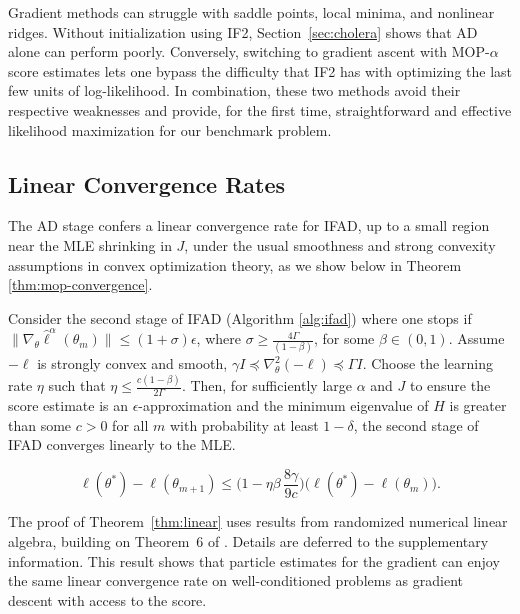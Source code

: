 \documentclass[9pt,twocolumn,pnasresearcharticle]{pnas-new}
\newcommand\arxiv[2]{#2} %
\begin{document}
Gradient methods can struggle with saddle points, local minima, and nonlinear ridges.
Without initialization using IF2, Section~\ref{sec:cholera} shows that AD alone can perform poorly.
Conversely, switching to gradient ascent with MOP-$\alpha$ score estimates lets one bypass the difficulty that IF2 has with optimizing the last few units of log-likelihood. 
In combination, these two methods avoid their respective weaknesses and provide, for the first time, straightforward and effective likelihood maximization for our benchmark problem.

\arxiv{}{\vspace*{-2mm}}
\subsection{Linear Convergence Rates}

The AD stage confers a linear convergence rate for IFAD, up to a small region near the MLE shrinking in $J$, under the usual smoothness and strong convexity assumptions in convex optimization theory, as we show below in Theorem \ref{thm:mop-convergence}.

\begin{thm} \label{thm:linear}
    
Consider the second stage of IFAD (Algorithm \ref{alg:ifad}) where one stops if $\|\nabla_\theta \hat\ell^\alpha(\theta_m)\| \leq (1+\sigma) \epsilon$, where $\sigma \geq \frac{4 \Gamma}{(1-\beta)}$, for some $\beta \in (0,1)$. Assume $-\ell$ is strongly convex and smooth, $\gamma I \preceq \nabla_\theta^2 (-\ell) \preceq \Gamma I$. Choose the learning rate $\eta$ such that $\eta \leq \frac{c(1-\beta)}{2\Gamma}$. Then, for sufficiently large $\alpha$ and $J$ to ensure the score estimate is an $\epsilon$-approximation and the minimum eigenvalue of $H$ is greater than some $c > 0$ for all $m$ with probability at least $1-\delta$, the second stage of IFAD converges linearly to the MLE.

\arxiv{}{\vspace*{-2mm}}
$$
\ell(\theta^*) - \ell(\theta_{m+1}) \leq \Big(1-\eta\beta\, \frac{8\gamma}{9c}\Big)\big(\ell(\theta^*)-\ell(\theta_m)\big).
$$
\label{thm:mop-convergence}
\end{thm}
\arxiv{}{\vspace*{-5mm}}
The proof of Theorem~\ref{thm:linear} uses results from randomized numerical linear algebra, building on Theorem~6 of \cite{mahoney16}. 
Details are deferred to \arxiv{Appendix~\ref{appendix:convergence}}{the supplementary information}. 
This result shows that particle estimates for the gradient can enjoy the same linear convergence rate on well-conditioned problems as gradient descent with access to the score. 
\end{document}
